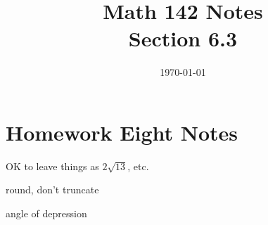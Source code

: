 \documentclass{exam}
\title{Math 142 Notes \\ Section 6.3}
\date{\today}
\begin{document}
  \maketitle
  \tableofcontents

  \section{Homework Eight Notes}
  \begin{itemize*}
    \item OK to leave things as $2 \sqrt{13}$, etc.
    \item round, don't truncate
    \item angle of depression
  \end{itemize*}
\end{document}
